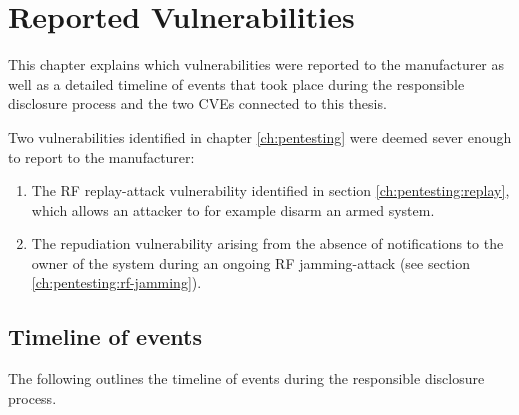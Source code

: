 \chapter{Reported Vulnerabilities} \label{ch:reported-vulns}
This chapter explains which vulnerabilities were reported to the manufacturer as well as a detailed timeline of events that took place during the responsible disclosure process and the two CVEs connected to this thesis.

Two vulnerabilities identified in chapter \ref{ch:pentesting} were deemed sever enough to report to the manufacturer:
\begin{enumerate}
    \item The RF replay-attack vulnerability identified in section \ref{ch:pentesting:replay}, which allows an attacker to for example disarm an armed system.
    \item The repudiation vulnerability arising from the absence of notifications to the owner of the system during an ongoing RF jamming-attack (see section \ref{ch:pentesting:rf-jamming}).
\end{enumerate}

\section{Timeline of events}
The following outlines the timeline of events during the responsible disclosure process.

